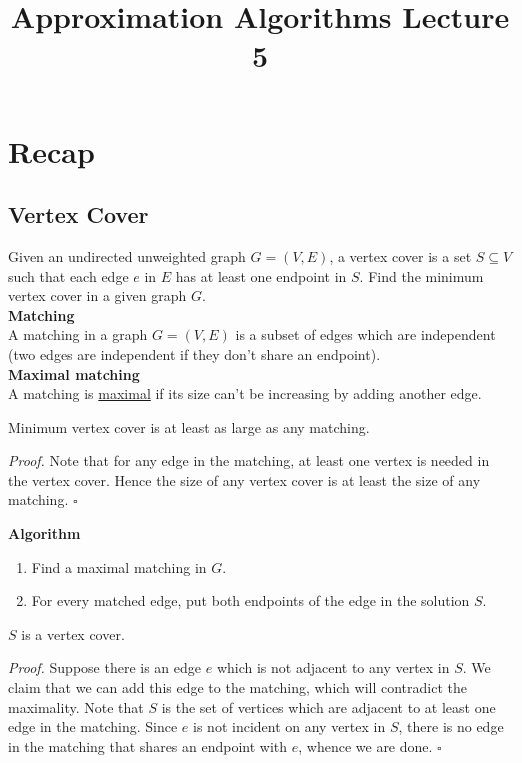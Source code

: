 \documentclass[a4paper]{article}
\title{\textbf{Approximation Algorithms Lecture 5}}
\date{}
\newenvironment{proof}{\begin{breakbox}\textit{Proof.}}{\hfill$\square$\end{breakbox}}
\newcommand{\nl}{\vspace{0.2cm}\\}
\begin{document}
\maketitle
\tableofcontents

\section{Recap}

\subsection{Vertex Cover}

Given an undirected unweighted graph $G = (V, E)$, a vertex cover is a set $S \subseteq V$ such that each edge $e$ in $E$ has at least one endpoint in $S$. Find the minimum vertex cover in a given
graph $G$.\nl

\textbf{Matching}\nl
A matching in a graph $G = (V, E)$ is a subset of edges which are independent (two edges are independent if they don't share an endpoint).\nl

\textbf{Maximal matching}\nl
A matching is \underline{maximal} if its size can't be increasing by adding another edge.\nl

\begin{claim}
    Minimum vertex cover is at least as large as any matching.
\end{claim}
\begin{proof}
    Note that for any edge in the matching, at least one vertex is needed in the vertex cover. Hence the size of any vertex cover is at least the size of any matching.
\end{proof}

\textbf{Algorithm}
\begin{enumerate}
    \item Find a maximal matching in $G$.
    \item For every matched edge, put both endpoints of the edge in the solution $S$.
\end{enumerate}

\begin{claim}
    $S$ is a vertex cover.
\end{claim}

\begin{proof}
    Suppose there is an edge $e$ which is not adjacent to any vertex in $S$. We claim that we can add this edge to the matching, which will contradict the maximality. Note that $S$ is the set of vertices
    which are adjacent to at least one edge in the matching. Since $e$ is not incident on any vertex in $S$, there is no edge in the matching that shares an endpoint with $e$, whence we are done.
\end{proof}
\end{document}
